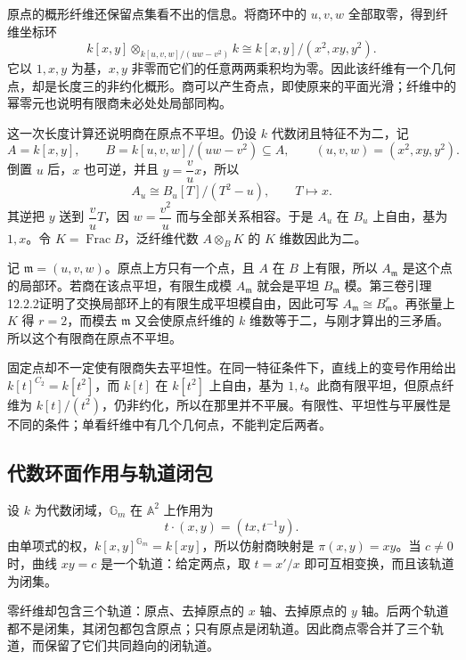 \ProseParagraphBreak
原点的概形纤维还保留点集看不出的信息。将商环中的 \(u,v,w\) 全部取零，得到纤维坐标环
\[
	k[x,y]\otimes_{k[u,v,w]/(uw-v^2)} k \cong k[x,y]/(x^2,xy,y^2).
\]
它以 \(1,x,y\) 为基，\(x,y\) 非零而它们的任意两两乘积均为零。因此该纤维有一个几何点，却是长度三的非约化概形。商可以产生奇点，即使原来的平面光滑；纤维中的幂零元也说明有限商未必处处局部同构。

\ProseParagraphBreak
这一次长度计算还说明商在原点不平坦。仍设 \(k\) 代数闭且特征不为二，记
\[
	A=k[x,y],\qquad B=k[u,v,w]/(uw-v^2)\subseteq A, \qquad(u,v,w)=(x^2,xy,y^2).
\]
倒置 \(u\) 后，\(x\) 也可逆，并且 \(y=\dfrac vu x\)，所以
\[
	A_u\cong B_u[T]/(T^2-u),\qquad T\longmapsto x.
\]
其逆把 \(y\) 送到 \(\dfrac vu T\)，因 \(w=\dfrac{v^2}{u}\) 而与全部关系相容。于是 \(A_u\) 在 \(B_u\) 上自由，基为 \(1,x\)。令 \(K=\operatorname{Frac}B\)，泛纤维代数 \(A\otimes_BK\) 的 \(K\) 维数因此为二。

\ProseParagraphBreak
记 \(\mathfrak m=(u,v,w)\)。原点上方只有一个点，且 \(A\) 在 \(B\) 上有限，所以 \(A_{\mathfrak m}\) 是这个点的局部环。若商在该点平坦，有限生成模 \(A_{\mathfrak m}\) 就会是平坦 \(B_{\mathfrak m}\) 模。第三卷引理12.2.2证明了交换局部环上的有限生成平坦模自由，因此可写 \(A_{\mathfrak m}\cong B_{\mathfrak m}^r\)。再张量上 \(K\) 得 \(r=2\)，而模去 \(\mathfrak m\) 又会使原点纤维的 \(k\) 维数等于二，与刚才算出的三矛盾。所以这个有限商在原点不平坦。

\ProseParagraphBreak
固定点却不一定使有限商失去平坦性。在同一特征条件下，直线上的变号作用给出 \(k[t]^{C_2}=k[t^2]\)，而 \(k[t]\) 在 \(k[t^2]\) 上自由，基为 \(1,t\)。此商有限平坦，但原点纤维为 \(k[t]/(t^2)\)，仍非约化，所以在那里并不平展。有限性、平坦性与平展性是不同的条件；单看纤维中有几个几何点，不能判定后两者。

\subsection{代数环面作用与轨道闭包}
\label{b5:subsec:2206:03}

设 \(k\) 为代数闭域，\(\mathbb G_m\) 在 \(\mathbb A^2\) 上作用为
\[
	t\cdot(x,y)=(tx,t^{-1}y).
\]
由单项式的权，\(k[x,y]^{\mathbb G_m}=k[xy]\)，所以仿射商映射是 \(\pi(x,y)=xy\)。当 \(c\ne0\) 时，曲线 \(xy=c\) 是一个轨道：给定两点，取 \(t=x'/x\) 即可互相变换，而且该轨道为闭集。

\ProseParagraphBreak
零纤维却包含三个轨道：原点、去掉原点的 \(x\) 轴、去掉原点的 \(y\) 轴。后两个轨道都不是闭集，其闭包都包含原点；只有原点是闭轨道。因此商点零合并了三个轨道，而保留了它们共同趋向的闭轨道。

